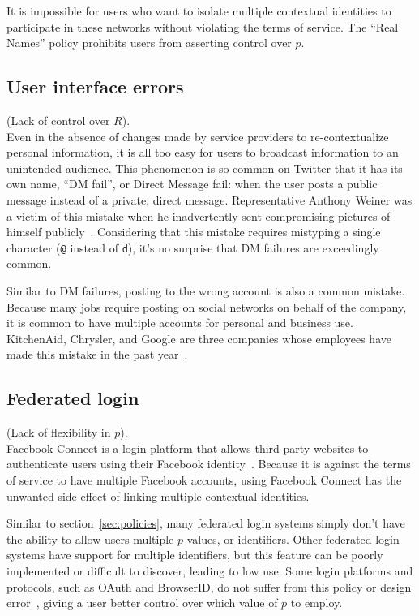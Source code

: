 \documentclass{llncs}
\begin{document}
It is impossible for users who want to isolate multiple contextual identities
to participate in these networks without violating the terms of service.  The
``Real Names'' policy prohibits users from asserting control over $p$.

\subsection{User interface errors}
(Lack of control over $R$).\\
Even in the absence of changes made by service providers to re-contextualize
personal information, it is all too easy for users to broadcast information to
an unintended audience. This phenomenon is so common on Twitter that it has its
own name, ``DM fail'', or Direct Message fail: when the user posts a public
message instead of a private, direct message. Representative Anthony Weiner was
a victim of this mistake when he inadvertently sent compromising pictures of
himself publicly~\cite{weiner}. Considering that this mistake requires
mistyping a single character (\texttt{@} instead of \texttt{d}), it's no
surprise that DM failures are exceedingly common.

Similar to DM failures, posting to the wrong account is also a common mistake.
Because many jobs require posting on social networks on behalf of the company,
it is common to have multiple accounts for personal and business use.
KitchenAid, Chrysler, and Google are three companies whose employees have
made this mistake in the past year~\cite{kitchenaid,chrysler,yegge}.

\subsection{Federated login}
\label{sec:login}
(Lack of flexibility in $p$).\\
Facebook Connect is a login platform that allows third-party websites to
authenticate users using their Facebook identity~\cite{fb_connect}. Because it
is against the terms of service to have multiple Facebook accounts, using
Facebook Connect has the unwanted side-effect of linking multiple contextual
identities.

Similar to section~\ref{sec:policies}, many federated login systems simply
don't have the ability to allow users multiple $p$ values, or identifiers.
Other federated login systems have support for multiple identifiers, but
this feature can be poorly implemented or difficult to discover, leading to
low use.
Some login platforms and protocols, such as OAuth and BrowserID,
do not suffer from this policy or design error~\cite{browserid,oauth},
giving a user better control over which value of $p$ to employ.
\end{document}
